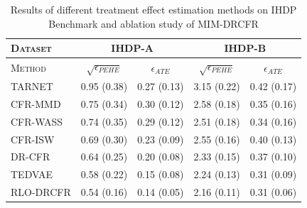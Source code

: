 \documentclass[sigconf]{acmart}
\begin{document}
\begin{center}
\begin{table}[h]                  
\setlength{\abovecaptionskip}{0pt}%
\setlength{\belowcaptionskip}{0pt}%
\caption{Results of different treatment effect estimation methods on IHDP Benchmark and ablation study of MIM-DRCFR}
\centering
\begin{threeparttable}
\begin{tabular}{lllll}
\toprule[1pt]
\textsc{Dataset} & \multicolumn{2}{c}{IHDP-A}  & \multicolumn{2}{c}{IHDP-B} \\ \midrule
\textsc{Method} &
  \multicolumn{1}{c}{$\sqrt{\epsilon_{\textit{PEHE}}}$} &
  \multicolumn{1}{c}{$\epsilon_{\textit{ATE}}$} &
  \multicolumn{1}{c}{$\sqrt{\epsilon_{\textit{PEHE}}}$} &
  \multicolumn{1}{c}{$\epsilon_{\textit{ATE}}$}  \\ \midrule
\multicolumn{1}{l}{TARNET}  & 0.95 \footnotesize(0.38) & 0.27 \footnotesize(0.13)  & 3.15 \footnotesize(0.22)  & 0.42 \footnotesize(0.17) \\
\multicolumn{1}{l}{CFR-MMD}  & 0.75 \footnotesize(0.34) & 0.30 \footnotesize(0.12)   & 2.58 \footnotesize(0.18) & 0.35  \footnotesize(0.16) \\
\multicolumn{1}{l}{CFR-WASS} & 0.74 \footnotesize(0.35) & 0.29 \footnotesize(0.12)  & 2.51 \footnotesize(0.18) & 0.34   \footnotesize(0.16)\\
\multicolumn{1}{l}{CFR-ISW}   & 0.69 \footnotesize(0.30) & 0.23 \footnotesize(0.09) & 2.55 \footnotesize(0.16) & 0.40   \footnotesize(0.13) \\
\multicolumn{1}{l}{DR-CFR}    & 0.64 \footnotesize(0.25) & 0.20 \footnotesize(0.08) & 2.33 \footnotesize(0.15)& 0.37  \footnotesize(0.10) \\ 
\multicolumn{1}{l}{TEDVAE}    & 0.58 \footnotesize(0.22) & 0.15 \footnotesize(0.08) & 2.24 \footnotesize(0.13) & 0.31   \footnotesize(0.09) \\ \midrule
\multicolumn{1}{l}{RLO-DRCFR}  & 0.54 \footnotesize(0.16) & 0.14  \footnotesize(0.05) & 2.16 \footnotesize(0.11) & 0.31   \footnotesize(0.06)\\  

\end{tabular}
\end{threeparttable}
\end{table}
\end{center}
\end{document}
